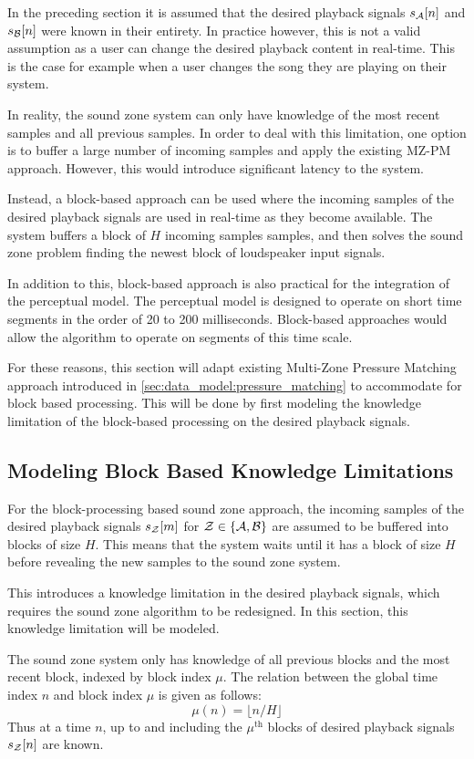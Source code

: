 In the preceding section it is assumed that the desired playback signals $s_{\mathcal{A}}[n]$ and $s_{\mathcal{B}}[n]$ were known in their entirety.
In practice however, this is not a valid assumption as a user can change the desired playback content in real-time.
This is the case for example when a user changes the song they are playing on their system.

In reality, the sound zone system can only have knowledge of the most recent samples and all previous samples.
In order to deal with this limitation, one option is to buffer a large number of incoming samples and apply the existing MZ-PM approach.
However, this would introduce significant latency to the system.

Instead, a block-based approach can be used where the incoming samples of the desired playback signals are used in real-time as they become available.
The system buffers a block of $H$ incoming samples samples, and then solves the sound zone problem finding the newest block of loudspeaker input signals.

In addition to this, block-based approach is also practical for the integration of the perceptual model.
The perceptual model is designed to operate on short time segments in the order of 20 to 200 milliseconds.
Block-based approaches would allow the algorithm to operate on segments of this time scale.

For these reasons, this section will adapt existing Multi-Zone Pressure Matching approach introduced in 
\autoref{sec:data_model:pressure_matching} to accommodate for block based processing.
This will be done by first modeling the knowledge limitation of the block-based processing on the desired playback signals.

\subsection{Modeling Block Based Knowledge Limitations}
For the block-processing based sound zone approach, the incoming samples of the desired playback signals 
$s_{\mathcal{Z}}[m]$ for $\mathcal{Z}\in\left\{\mathcal{A},\mathcal{B}\right\}$ are assumed to be buffered into blocks of size $H$.
This means that the system waits until it has a block of size $H$ before revealing the new samples to the sound zone system.

This introduces a knowledge limitation in the desired playback signals, which requires the sound zone algorithm to be redesigned.
In this section, this knowledge limitation will be modeled.

The sound zone system only has knowledge of all previous blocks and the most recent block, indexed by block index $\mu$.
The relation between the global time index $n$ and block index $\mu$ is given as follows:  
\begin{equation}
    \mu(n) = \lfloor n / H \rfloor
\end{equation}
Thus at a time $n$, up to and including the $\mu^\text{th}$ blocks of desired playback signals $s_{\mathcal{Z}}[n]$ are known.

